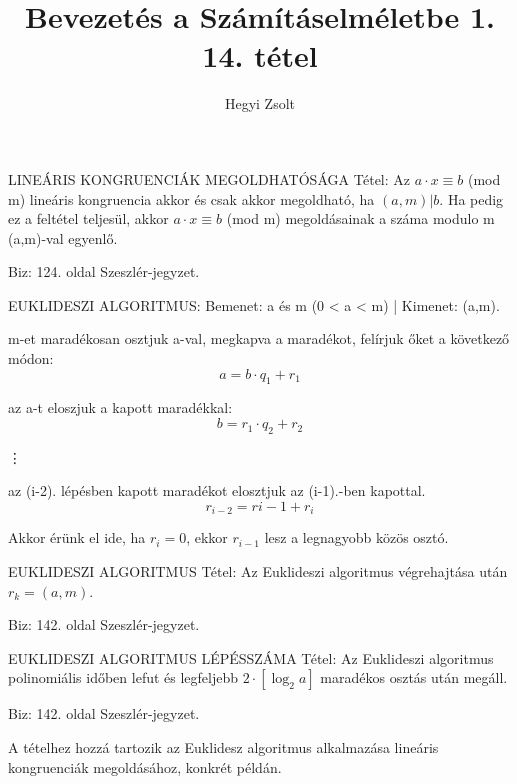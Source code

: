 \documentclass[]{article}
\title{Bevezetés a Számításelméletbe 1.\\{\large 14. tétel}}
\author{Hegyi Zsolt}
\begin{document}
\maketitle{}
\begin{framed}
LINEÁRIS KONGRUENCIÁK MEGOLDHATÓSÁGA Tétel: Az $a \cdot x \equiv b$ (mod m) lineáris kongruencia akkor és csak akkor megoldható, ha $(a,m)|b$. Ha pedig ez a feltétel teljesül, akkor  $a \cdot x \equiv b$ (mod m) megoldásainak a száma modulo m (a,m)-val egyenlő.
\end{framed}
\begin{leftbar}
Biz: 124. oldal Szeszlér-jegyzet.
\end{leftbar}
\begin{framed}
EUKLIDESZI ALGORITMUS: Bemenet: a és m (0 < a < m) | Kimenet: (a,m).
\begin{description}
\item[1. lépés:]m-et maradékosan osztjuk a-val, megkapva a maradékot, felírjuk őket a következő módon:
$$a = b\cdot q_1 + r_1$$
\item[2. lépés:]az a-t eloszjuk a kapott maradékkal:
$$b = r_1\cdot q_2 + r_2$$
\item \vdots
\item[i. lépés:] az (i-2). lépésben kapott maradékot elosztjuk az (i-1).-ben kapottal.
$$r_{i-2} = r{i-1} + r_i$$
\item[Utolsó lépés] Akkor érünk el ide, ha $r_i = 0$, ekkor $r_{i-1}$ lesz a legnagyobb közös osztó.
\end{description}
\end{framed}
\begin{framed}
EUKLIDESZI ALGORITMUS Tétel: Az Euklideszi algoritmus végrehajtása után $r_k = (a,m)$.
\end{framed}
\begin{leftbar}
Biz: 142. oldal Szeszlér-jegyzet.
\end{leftbar}
\begin{framed}
EUKLIDESZI ALGORITMUS LÉPÉSSZÁMA Tétel: Az Euklideszi algoritmus polinomiális időben lefut és legfeljebb $2 \cdot [\log_2a]$ maradékos osztás után megáll.
\end{framed}
\begin{leftbar}
Biz: 142. oldal Szeszlér-jegyzet.
\end{leftbar}
A tételhez hozzá tartozik az Euklidesz algoritmus alkalmazása lineáris kongruenciák megoldásához, konkrét példán.
\end{document}
